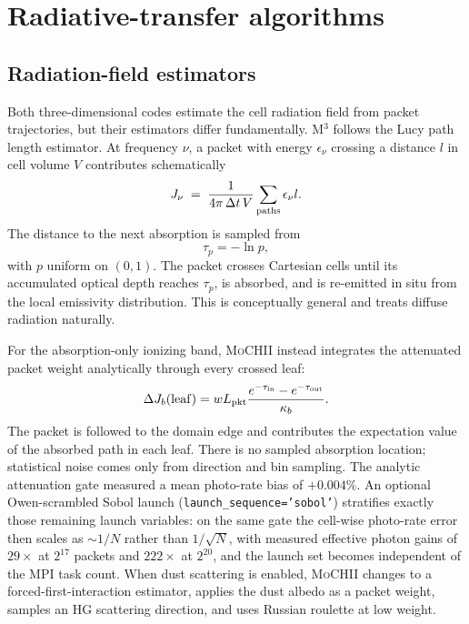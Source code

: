 \documentclass[english,a4paper]{my_memo}
\newcommand{\code}[1]{\texttt{#1}}
\newcommand{\MoCHII}{\textsc{MoCHII}}
\newcommand{\Mthree}{M$^3$}
\begin{document}
\section{Radiative-transfer algorithms}

\subsection{Radiation-field estimators}

Both three-dimensional codes estimate the cell radiation field from packet trajectories, but
their estimators differ fundamentally.  \Mthree{} follows the Lucy path
length estimator.  At frequency $\nu$, a packet with energy
$\epsilon_\nu$ crossing a distance $l$ in cell volume $V$ contributes
schematically
\begin{equation}
 J_\nu \;=\; \frac{1}{4\pi\,\Delta t\,V}
       \sum_{\rm paths}\epsilon_\nu l .
 \label{eq:m3j}
\end{equation}
The distance to the next absorption is sampled from
\begin{equation}
 \tau_p=-\ln p,
 \label{eq:taup}
\end{equation}
with $p$ uniform on $(0,1)$.  The packet crosses Cartesian cells until its
accumulated optical depth reaches $\tau_p$, is absorbed, and is re-emitted
in situ from the local emissivity distribution.  This is conceptually
general and treats diffuse radiation naturally.

For the absorption-only ionizing band, \MoCHII{} instead integrates the
attenuated packet weight analytically through every crossed leaf:
\begin{equation}
 \Delta J_b({\rm leaf}) = w L_{\rm pkt}
   \frac{e^{-\tau_{\rm in}}-e^{-\tau_{\rm out}}}{\kappa_b} .
 \label{eq:edge}
\end{equation}
The packet is followed to the domain edge and contributes the expectation
value of the absorbed path in each leaf.  There is no sampled absorption
location; statistical noise comes only from direction and bin sampling.
The analytic attenuation gate measured a mean photo-rate bias of
$+0.004\%$.  An optional Owen-scrambled Sobol launch
(\code{launch\_sequence='sobol'}) stratifies exactly those remaining
launch variables: on the same gate the cell-wise photo-rate error then
scales as $\sim 1/N$ rather than $1/\sqrt{N}$, with measured effective
photon gains of $29\times$ at $2^{17}$ packets and $222\times$ at
$2^{20}$, and the launch set becomes independent of the MPI task count.  When dust scattering is enabled, \MoCHII{} changes to a
forced-first-interaction estimator, applies the dust albedo as a packet
weight, samples an HG scattering direction, and uses Russian roulette at
low weight.
\end{document}
